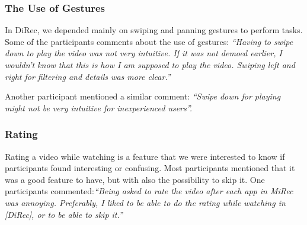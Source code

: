 \subsubsection{The Use of Gestures}
In DiRec, we depended mainly on swiping and panning gestures to perform tasks.
Some of the participants comments about the use of gestures: \textit{``Having to
swipe down to play the video was not very intuitive. If it was not demoed
earlier, I wouldn't know that this is how I am supposed to play the video. Swiping left and right for filtering and details was more clear.''}\par
Another participant mentioned a similar comment: \textit{``Swipe down for
playing might not be very intuitive for inexperienced users''.}
\subsubsection{Rating}
Rating a video while watching is a feature that we were interested to
know if participants found interesting or confusing. Most participants
mentioned that it was a good feature to have, but with also the
possibility to skip it. One participants commented:\textit{``Being asked to rate the video after each app in MiRec was
annoying. Preferably, I liked to be able to do the rating while watching in
[DiRec], or to be able to skip it.''}\par

